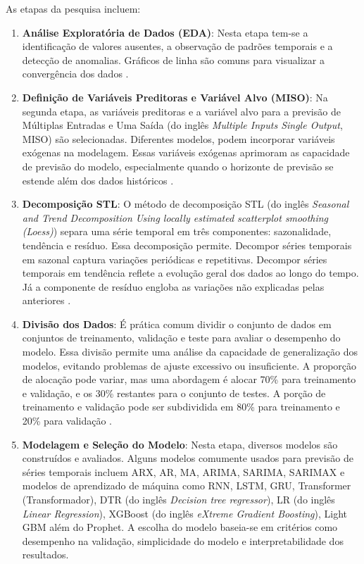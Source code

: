 \noindent As etapas da pesquisa incluem:
\begin{enumerate}[start=1, label={\textbf{Etapa} \arabic*}]
	
	\item \label{etp:1} \textbf{Análise Exploratória de Dados (EDA)}: Nesta etapa  tem-se a identificação de valores ausentes, a observação de padrões temporais e a detecção de anomalias. Gráficos de linha são comuns para visualizar a convergência dos dados \cite{Rostam2021108249}.
	
	\item \label{etp:2} \textbf{Definição de Variáveis Preditoras e Variável Alvo (MISO)}: Na segunda etapa, as variáveis preditoras e a variável alvo para a previsão de Múltiplas Entradas e Uma Saída (do inglês\textit{ Multiple Inputs Single Output}, MISO) são selecionadas. Diferentes modelos, podem incorporar variáveis exógenas na modelagem. Essas variáveis exógenas aprimoram as capacidade de previsão do modelo, especialmente quando o horizonte de previsão se estende além dos dados históricos \cite{PAWLOWSKI202298}. 
	
	\item \label{etp:3} \textbf{Decomposição STL}: O método de decomposição STL (do inglês \textit{Seasonal and Trend Decomposition Using locally estimated scatterplot smoothing (Loess)}) separa uma série temporal em três componentes: sazonalidade, tendência e resíduo. Essa decomposição permite. Decompor séries temporais em sazonal captura variações periódicas e repetitivas. Decompor séries temporais em tendência reflete a evolução geral dos dados ao longo do tempo. Já a componente de resíduo engloba as variações não explicadas pelas anteriores \cite{Bandara2021}.
	
	\item \label{etp:4} \textbf{Divisão dos Dados}: É prática comum dividir o conjunto de dados em conjuntos de treinamento, validação e teste para avaliar o desempenho do modelo. Essa divisão permite uma análise da capacidade de generalização dos modelos, evitando problemas de ajuste excessivo ou insuficiente. A proporção de alocação pode variar, mas uma abordagem é alocar 70\% para treinamento e validação, e os 30\% restantes para o conjunto de testes. A porção de treinamento e validação pode ser subdividida em 80\% para treinamento e 20\% para validação \cite{Tao2020}.
	
	\item \label{etp:5} \textbf{Modelagem e Seleção do Modelo}: Nesta etapa, diversos modelos são construídos e avaliados. Alguns modelos comumente usados para previsão de séries temporais incluem ARX, AR, MA, ARIMA, SARIMA, SARIMAX  e modelos de aprendizado de máquina como RNN, LSTM, GRU, Transformer (Transformador), DTR (do inglês \textit{Decision tree regressor}), LR (do inglês \textit{Linear Regression}), XGBoost (do inglês \textit{eXtreme Gradient Boosting}), Light GBM além do Prophet. A escolha do modelo baseia-se em critérios como desempenho na validação, simplicidade do modelo e interpretabilidade dos resultados.
	

\end{enumerate}
